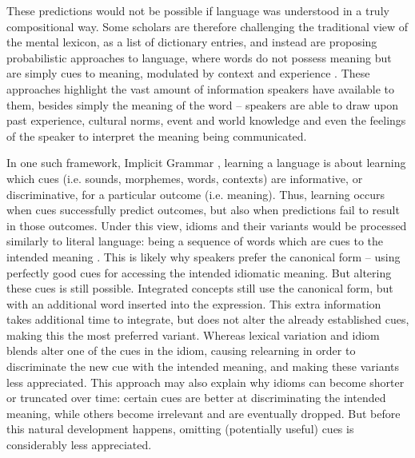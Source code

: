 \documentclass[output=paper,modfonts,nonflat]{langsci/langscibook}
\begin{document}
These predictions would not be possible if language was understood in a truly compositional way. Some scholars are therefore challenging the traditional view of the mental lexicon, as a list of dictionary entries, and instead are proposing probabilistic approaches to language, where words do not possess meaning but are simply cues to meaning, modulated by context and experience \citep{Elman2004, Elman2011, RamscarBaayen2013, RamscarBaayen2013}. These approaches highlight the vast amount of information speakers have available to them, besides simply the meaning of the word -- speakers are able to draw upon past experience, cultural norms, event and world knowledge and even the feelings of the speaker to interpret the meaning being communicated. 

In one such framework, Implicit Grammar \citep{BaayenRamscar2015}, learning a language is about learning which cues (i.e. sounds, morphemes, words, contexts) are informative, or discriminative, for a particular outcome (i.e. meaning). Thus, learning occurs when cues successfully predict outcomes, but also when predictions fail to result in those outcomes. Under this view, idioms and their variants would be processed similarly to literal language: being a sequence of words which are cues to the intended meaning \citep[cf.][]{GeeraertEtAl2017}. This is likely why speakers prefer the canonical form -- using perfectly good cues for accessing the intended idiomatic meaning. But altering these cues is still possible. Integrated concepts still use the canonical form, but with an additional word inserted into the expression. This extra information takes additional time to integrate, but does not alter the already established cues, making this the most preferred variant. Whereas lexical variation and idiom blends alter one of the cues in the idiom, causing relearning in order to discriminate the new cue with the intended meaning, and making these variants less appreciated. This approach may also explain why idioms can become shorter or truncated over time: certain cues are better at discriminating the intended meaning, while others become irrelevant and are eventually dropped. But before this natural development happens, omitting (potentially useful) cues is considerably less appreciated. 
\end{document}
